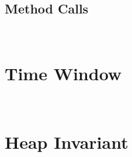   















\subsection{Method Calls}~\label{sec:basic}


\section{Time Window}~\label{sec:basic}

\section{Heap Invariant}~\label{sec:basic}
